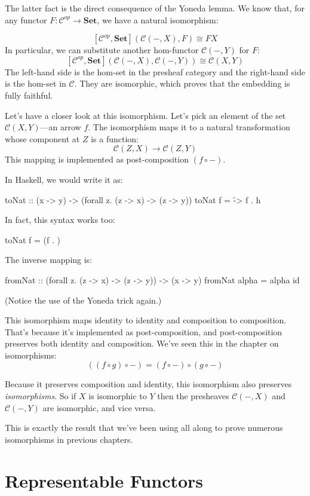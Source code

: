 \documentclass[DaoFP]{subfiles}
\begin{document}
The latter fact is the direct consequence of the Yoneda lemma. We know that, for any functor $F \colon \mathcal{C}^{op} \to \mathbf{Set}$, we have a natural isomorphism:

\[ [\mathcal{C}^{op}, \mathbf{Set}]( \mathcal{C}(-, X), F) \cong F X \]
In particular, we can substitute another hom-functor $\mathcal{C}(-, Y)$ for $F$:
\[ [\mathcal{C}^{op}, \mathbf{Set}]( \mathcal{C}(-, X), \mathcal{C}(-, Y)) \cong \mathcal{C}(X, Y)\]
The left-hand side is the hom-set in the presheaf category and the right-hand side is the hom-set in $\mathcal{C}$. They are isomorphic, which proves that the embedding is fully faithful.

Let's have a closer look at this isomorphism. Let's pick an element of the set $\mathcal{C}(X, Y)$---an arrow $f$. The isomorphism maps it to a natural transformation whose component at $Z$ is a function:
\[ \mathcal{C}(Z, X) \to \mathcal{C}(Z, Y) \]
This mapping is implemented as post-composition $(f \circ -)$.

In Haskell, we would write it as:
\begin{haskell}
toNat :: (x -> y) -> (forall z. (z -> x) -> (z -> y))
toNat f = \h -> f . h 
\end{haskell}
In fact, this syntax works too:
\begin{haskell}
toNat f = (f . )
\end{haskell}
The inverse mapping is:
\begin{haskell}
fromNat :: (forall z. (z -> x) -> (z -> y)) -> (x -> y)
fromNat alpha = alpha id
\end{haskell}
(Notice the use of the Yoneda trick again.)

This isomorphism maps identity to identity and composition to composition. That's because it's implemented as post-composition, and post-composition preserves both identity and composition. We've seen this in the chapter on isomorphisms:
\[ ((f \circ g) \circ -) = (f \circ -) \circ (g \circ -) \]

Because it preserves composition and identity, this isomorphism also preserves \emph{isomorphisms}. So if $X$ is isomorphic to $Y$ then the presheaves $ \mathcal{C}(-, X)$ and $ \mathcal{C}(-, Y)$ are isomorphic, and vice versa. 

This is exactly the result that we've been using all along to prove numerous isomorphisms in previous chapters. 

\section{Representable Functors}
\end{document}
